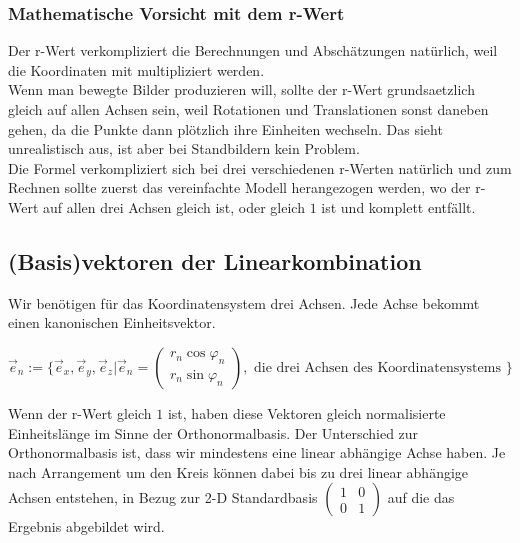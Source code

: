 \documentclass[a4paper]{article}
\begin{document}
\subsubsection{Mathematische Vorsicht mit dem r-Wert}

Der r-Wert verkompliziert die Berechnungen und Absch\"atzungen nat\"urlich, weil die Koordinaten mit multipliziert werden. \\

Wenn man bewegte Bilder produzieren will, sollte der r-Wert grundsaetzlich gleich auf allen Achsen sein, weil Rotationen und Translationen sonst daneben gehen, da die Punkte dann pl\"otzlich ihre Einheiten wechseln. Das sieht unrealistisch aus, ist aber
bei Standbildern kein Problem.\\

Die Formel verkompliziert sich bei drei verschiedenen r-Werten nat\"urlich und zum Rechnen sollte zuerst das vereinfachte Modell
herangezogen werden, wo der r-Wert auf allen drei Achsen gleich ist, oder gleich $1$ ist und komplett entf\"allt.\\

\subsection{(Basis)vektoren der Linearkombination}

Wir ben\"otigen f\"ur das Koordinatensystem drei Achsen. Jede Achse bekommt einen kanonischen Einheitsvektor. 

\begin{displaymath}
\vec{e}_n := \{ \vec{e}_x, \vec{e}_y, \vec{e}_z | \vec{e}_n = \begin{pmatrix}r_n \cos \varphi_n\\r_n \sin \varphi_n\end{pmatrix}, \mbox{ die drei Achsen des Koordinatensystems }\}
\end{displaymath}

Wenn der r-Wert gleich $1$ ist, haben diese Vektoren gleich normalisierte Einheitsl\"ange im Sinne der Orthonormalbasis. Der Unterschied zur Orthonormalbasis ist, dass wir mindestens eine linear abh\"angige Achse haben. Je nach Arrangement um den Kreis k\"onnen dabei bis zu drei linear abh\"angige Achsen entstehen, in Bezug zur 2-D Standardbasis $\begin{pmatrix}1&0\\0&1\end{pmatrix}$ auf die das Ergebnis abgebildet wird.\\
\end{document}
